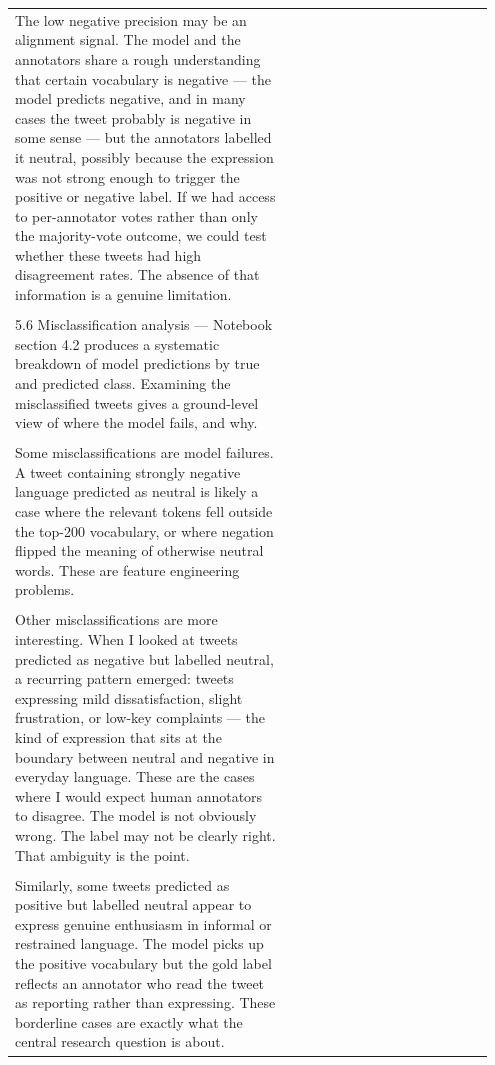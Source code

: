 \documentclass[11pt]{article}
\begin{document}
\begin{longtable}{|p{0.55\linewidth}|p{0.40\linewidth}|}
\hline
\rule{0pt}{3.5cm} & \\
\hline
The low negative precision may be an alignment signal. The model and the annotators share a rough understanding that certain vocabulary is negative --- the model predicts negative, and in many cases the tweet probably is negative in some sense --- but the annotators labelled it neutral, possibly because the expression was not strong enough to trigger the positive or negative label. If we had access to per-annotator votes rather than only the majority-vote outcome, we could test whether these tweets had high disagreement rates. The absence of that information is a genuine limitation. & \\[2pt]
\hline
\rule{0pt}{3.5cm} & \\
\hline
5.6 Misclassification analysis --- Notebook section 4.2 produces a systematic breakdown of model predictions by true and predicted class. Examining the misclassified tweets gives a ground-level view of where the model fails, and why. & \\[2pt]
\hline
\rule{0pt}{3.5cm} & \\
\hline
Some misclassifications are model failures. A tweet containing strongly negative language predicted as neutral is likely a case where the relevant tokens fell outside the top-200 vocabulary, or where negation flipped the meaning of otherwise neutral words. These are feature engineering problems. & \\[2pt]
\hline
\rule{0pt}{3.5cm} & \\
\hline
Other misclassifications are more interesting. When I looked at tweets predicted as negative but labelled neutral, a recurring pattern emerged: tweets expressing mild dissatisfaction, slight frustration, or low-key complaints --- the kind of expression that sits at the boundary between neutral and negative in everyday language. These are the cases where I would expect human annotators to disagree. The model is not obviously wrong. The label may not be clearly right. That ambiguity is the point. & \\[2pt]
\hline
\rule{0pt}{3.5cm} & \\
\hline
Similarly, some tweets predicted as positive but labelled neutral appear to express genuine enthusiasm in informal or restrained language. The model picks up the positive vocabulary but the gold label reflects an annotator who read the tweet as reporting rather than expressing. These borderline cases are exactly what the central research question is about. & \\[2pt]

\end{longtable}
\end{document}

